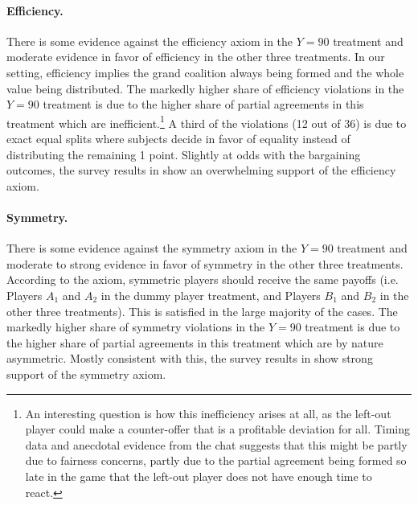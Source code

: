 \documentclass[12pt]{article}
\begin{document}
\paragraph{Efficiency.} There is some evidence against the efficiency axiom in the $Y=90$ treatment and moderate evidence in favor of efficiency in the other three treatments. In our setting, efficiency implies the grand coalition always being formed and the whole value being distributed. 
The markedly higher share of efficiency violations in the $Y=90$ treatment is due to the higher share of partial agreements in this treatment which are inefficient.\footnote{An interesting question is how this inefficiency arises at all, as the left-out player could make a counter-offer that is a profitable deviation for all. Timing data and anecdotal evidence from the chat suggests that this might be partly due to fairness concerns, partly due to the partial agreement being formed so late in the game that the left-out player does not have enough time to react.} A third of the violations (12 out of 36) is due to exact equal splits where subjects decide in favor of equality instead of distributing the remaining 1 point. 
Slightly at odds with the bargaining outcomes, the survey results in  show an overwhelming support of the efficiency axiom.

\paragraph{Symmetry.} There is some evidence against the symmetry axiom in the $Y=90$ treatment and moderate to strong evidence in favor of symmetry in the other three treatments. According to the axiom, symmetric players should receive the same payoffs (i.e. Players $A_1$ and $A_2$ in the dummy player treatment, and Players $B_1$ and $B_2$ in the other three treatments). This is satisfied in the large majority of the cases. The markedly higher share of symmetry violations in the $Y=90$ treatment is due to the higher share of partial agreements in this treatment which are by nature asymmetric. Mostly consistent with this, the survey results in  show strong support of the symmetry axiom.
\end{document}
